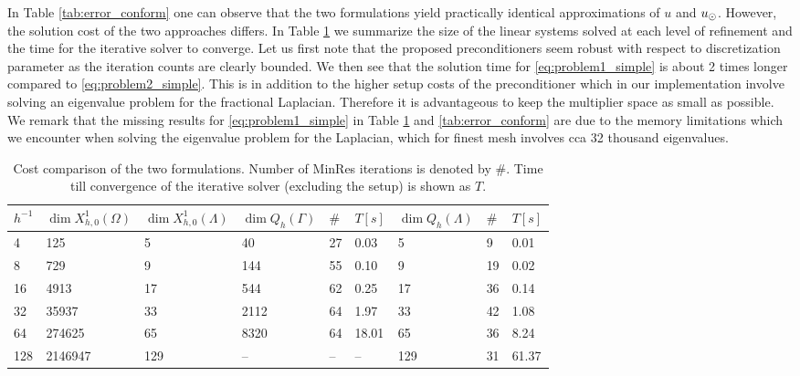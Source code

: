 In Table \ref{tab:error_conform} one can observe that the two formulations
yield practically identical approximations of $u$ and $u_{\odot}$. However, the solution
cost of the two approaches differs. In Table \ref{tab:cost} we summarize the
size of the linear systems solved at each level of refinement and the time
for the iterative solver to converge. Let us first note that the proposed
preconditioners seem robust with respect to discretization parameter as
the iteration counts are clearly bounded. We then see that the solution
time for \eqref{eq:problem1_simple} is about 2 times longer compared to
\eqref{eq:problem2_simple}. This is in addition to the higher setup costs
of the preconditioner which in our implementation involve solving an eigenvalue
problem for the fractional Laplacian. Therefore it is advantageous to keep
the multiplier space as small as possible. We remark that the missing
results for \eqref{eq:problem1_simple} in Table \ref{tab:cost} and \ref{tab:error_conform}
are due to the memory limitations which we encounter when solving the eigenvalue problem
for the Laplacian, which for finest mesh involves cca 32 thousand eigenvalues.
%
\begin{table}
  \scriptsize{
  \begin{center}
    \begin{tabular}{l|ll|lll|lll}
      \hline
      $h^{-1}$ & $\dim{X^1_{h, 0}(\Omega)}$ & $\dim{X^1_{h, 0}(\Lambda)}$ & $\dim{Q_h(\Gamma)}$ & $\#$ & $T\left[s\right]$ & $\dim{Q_h(\Lambda)}$ & $\#$ & $T\left[s\right]$\\
      \hline
4   &125     &5   &40    &27 &0.03  &5   &9  &0.01\\
8   &729     &9   &144   &55 &0.10  &9   &19 &0.02\\
16  &4913    &17  &544   &62 &0.25  &17  &36 &0.14\\
32  &35937   &33  &2112  &64 &1.97  &33  &42 &1.08\\
64  &274625  &65  &8320  &64 &18.01 &65  &36 &8.24\\
128 &2146947 &129 &--    &-- &--    &129 &31 &61.37\\
\hline
    \end{tabular}
    \end{center}
    }
  \caption{Cost comparison of the two formulations. Number of MinRes iterations
    is denoted by $\#$. Time till convergence of the iterative solver (excluding the setup) is shown
    as $T$.
  }
\label{tab:cost}
\end{table}

